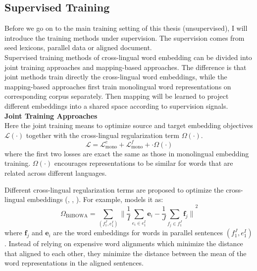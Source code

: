 %
%
%
	

\subsection{Supervised Training}
Before we go on to the main training setting of this thesis (unsupervised), I will introduce the training methods under supervision. The supervision comes from seed lexicons, parallel data or aligned document.\\
Supervised training methods of cross-lingual word embedding can be divided into joint training approaches and mapping-based approaches. The difference is that joint methods train directly the cross-lingual word embeddings, while the mapping-based approaches first train monolingual word representations on corresponding corpus separately. Then mapping will be learned to project different embeddings into a shared space according to supervision signals. \\

\textbf{Joint Training Approaches}\\
Here the joint training means to optimize source and target embedding objectives $\mathcal{L(\cdot)}$ together with the cross-lingual regularization term $\Omega(\cdot)$. 
\[ \mathcal{L} =  \mathcal{L}_{\text{mono}}^e + \mathcal{L}_{\text{mono}}^f + \cdot \Omega(\cdot)  \]
where the first two losses are exact the same as those in monolingual embedding training.  $\Omega(\cdot)$  encourages representations to be similar for words that are related across different languages.

Different cross-lingual regularization terms are proposed to optimize the cross-lingual embeddings (\cite{coulmance2016trans}, \cite{luong2015bilingual}, \cite{gouws2015bilbowa}). For example, \cite{gouws2015bilbowa} models it as: 
\[ \Omega_{\text{BilBOWA}} = \sum_{( f_1^J, e_1^I)}{\lVert \frac{1}{I}  \sum_{e_i \in e_1^I} \bm{e}_i - \frac{1}{J} \sum_{f_j \in f_1^J} \bm{f}_j\rVert}^2 \]
where $\bm{f}_j$ and $\bm{e}_i$ are the word embeddings for words in parallel sentences $(f_1^J, e_1^I)$. Instead of relying on expensive word alignments which minimize the distance that aligned to each other, they minimize the distance between the mean of the word representations in the aligned sentences. \\


